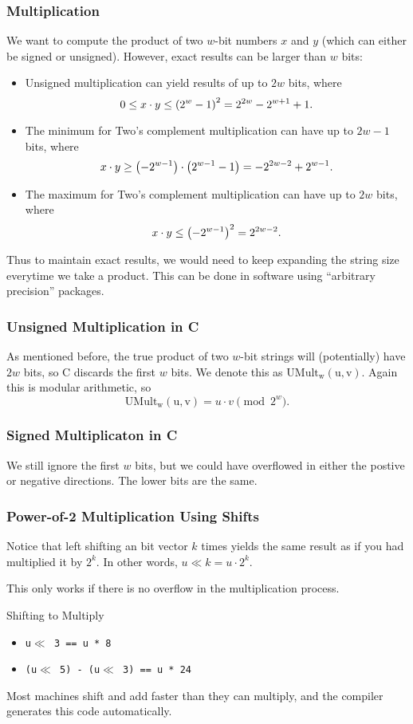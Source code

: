 \documentclass[class=article, crop=false]{standalone}
\begin{document}
  \subsubsection{Multiplication}
  We want to compute the product of two $w$-bit numbers $x$ and $y$ (which can either be signed or unsigned). However, exact results can be larger than $w$ bits:
  \begin{itemize}
    \item Unsigned multiplication can yield results of up to $2w$ bits, where
    \[
      0\leq x\cdot y\leq \left( 2^w - 1 \right)^2 = 2^{2w} - 2^{w+1} + 1.
    \]
    \item The minimum for Two's complement multiplication can have up to $2w - 1$ bits, where
    \[
      x\cdot y\geq \left( -2^{w-1} \right)\cdot \left( 2^{w-1}-1 \right) = -2^{2w - 2} + 2^{w-1}.
    \]
    \item The maximum for Two's complement multiplication can have up to $2w$ bits, where
    \[
      x\cdot y\leq \left( -2^{w-1} \right)^2 = 2^{2w - 2}.
    \]
  \end{itemize}
  Thus to maintain exact results, we would need to keep expanding the string size everytime we take a product. This can be done in software using ``arbitrary precision'' packages.
  \subsubsection{Unsigned Multiplication in C}
  As mentioned before, the true product of two $w$-bit strings will (potentially) have $2w$ bits, so C discards the first $w$ bits. We denote this as $\mathrm{UMult_w(u, v)}$. Again this is modular arithmetic, so
  \[
    \mathrm{UMult_w(u, v)} = u\cdot v\pmod{2^w}.
  \]
  \subsubsection{Signed Multiplicaton in C}
  We still ignore the first $w$ bits, but we could have overflowed in either the postive or negative directions. The lower bits are the same. 
  \subsubsection{Power-of-2 Multiplication Using Shifts}
  Notice that left shifting an bit vector $k$ times yields the same result as if you had multiplied it by $2^k$. In other words, $u\ll k = u\cdot 2^k$.
  \begin{note}{}
    This only works if there is no overflow in the multiplication process.
  \end{note}
  \begin{example}{Shifting to Multiply}
    \begin{itemize}
      \item \texttt{u\phantom{ }$\ll$ 3 == u * 8}
      \item \texttt{(u\phantom{ }$\ll$ 5) - (u\phantom{ }$\ll$ 3) == u * 24}
    \end{itemize}
  \end{example}
  Most machines shift and add faster than they can multiply, and the compiler generates this code automatically.
\end{document}
